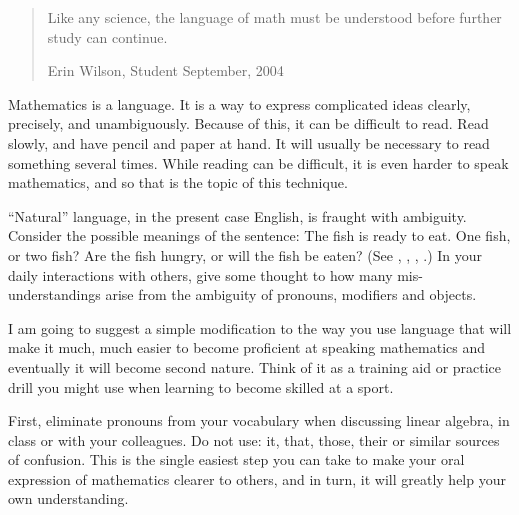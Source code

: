 \begin{para}\begin{quote}
\begin{para}Like any science, the language of math must be understood before further study can continue.\end{para}
\begin{flushright}
Erin Wilson, Student\newline
September, 2004
\end{flushright}
\end{quote}
\end{para}
%
\begin{para}Mathematics is a language.  It is a way to express complicated ideas clearly, precisely, and unambiguously.  Because of this, it can be difficult to read.  Read slowly, and have pencil and paper at hand.  It will usually be necessary to read something several times.  While reading can be difficult, it is even harder to speak mathematics, and so that is the topic of this technique.\end{para}
%
\begin{para}``Natural'' language, in the present case English, is fraught with ambiguity.  Consider the possible meanings of the sentence: The fish is ready to eat.  One fish, or two fish?  Are the fish hungry, or will the fish be eaten?  (See , , , .)  In your daily interactions with others, give some thought to how many mis-understandings arise from the ambiguity of pronouns, modifiers and objects.\end{para}
%
\begin{para}I am going to suggest a simple modification to the way you use language that will make it much, much easier to become proficient at speaking mathematics and eventually it will become second nature.  Think of it as a training aid or practice drill you might use when learning to become skilled at a sport.\end{para}
%
\begin{para}First, eliminate pronouns from your vocabulary when discussing linear algebra, in class or with your colleagues.  Do not use: it, that, those, their or similar sources of confusion.  This is the single easiest step you can take to make your oral expression of mathematics clearer to others, and in turn, it will greatly help your own understanding.\end{para}

